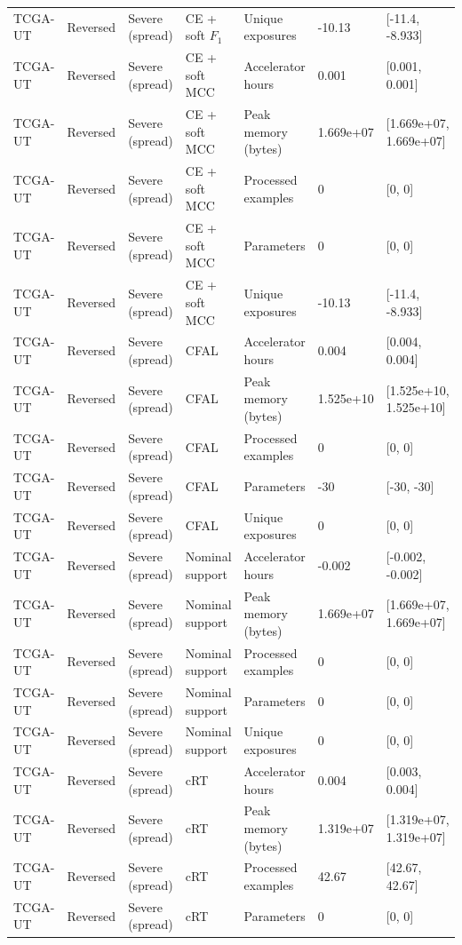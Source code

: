 \begin{longtable}{lllllll}
TCGA-UT & Reversed & Severe (spread) & CE + soft $F_1$ & Unique exposures & -10.13 & [-11.4, -8.933] \\
TCGA-UT & Reversed & Severe (spread) & CE + soft MCC & Accelerator hours & 0.001 & [0.001, 0.001] \\
TCGA-UT & Reversed & Severe (spread) & CE + soft MCC & Peak memory (bytes) & 1.669e+07 & [1.669e+07, 1.669e+07] \\
TCGA-UT & Reversed & Severe (spread) & CE + soft MCC & Processed examples & 0 & [0, 0] \\
TCGA-UT & Reversed & Severe (spread) & CE + soft MCC & Parameters & 0 & [0, 0] \\
TCGA-UT & Reversed & Severe (spread) & CE + soft MCC & Unique exposures & -10.13 & [-11.4, -8.933] \\
TCGA-UT & Reversed & Severe (spread) & CFAL & Accelerator hours & 0.004 & [0.004, 0.004] \\
TCGA-UT & Reversed & Severe (spread) & CFAL & Peak memory (bytes) & 1.525e+10 & [1.525e+10, 1.525e+10] \\
TCGA-UT & Reversed & Severe (spread) & CFAL & Processed examples & 0 & [0, 0] \\
TCGA-UT & Reversed & Severe (spread) & CFAL & Parameters & -30 & [-30, -30] \\
TCGA-UT & Reversed & Severe (spread) & CFAL & Unique exposures & 0 & [0, 0] \\
TCGA-UT & Reversed & Severe (spread) & Nominal support & Accelerator hours & -0.002 & [-0.002, -0.002] \\
TCGA-UT & Reversed & Severe (spread) & Nominal support & Peak memory (bytes) & 1.669e+07 & [1.669e+07, 1.669e+07] \\
TCGA-UT & Reversed & Severe (spread) & Nominal support & Processed examples & 0 & [0, 0] \\
TCGA-UT & Reversed & Severe (spread) & Nominal support & Parameters & 0 & [0, 0] \\
TCGA-UT & Reversed & Severe (spread) & Nominal support & Unique exposures & 0 & [0, 0] \\
TCGA-UT & Reversed & Severe (spread) & cRT & Accelerator hours & 0.004 & [0.003, 0.004] \\
TCGA-UT & Reversed & Severe (spread) & cRT & Peak memory (bytes) & 1.319e+07 & [1.319e+07, 1.319e+07] \\
TCGA-UT & Reversed & Severe (spread) & cRT & Processed examples & 42.67 & [42.67, 42.67] \\
TCGA-UT & Reversed & Severe (spread) & cRT & Parameters & 0 & [0, 0] \\

\end{longtable}
